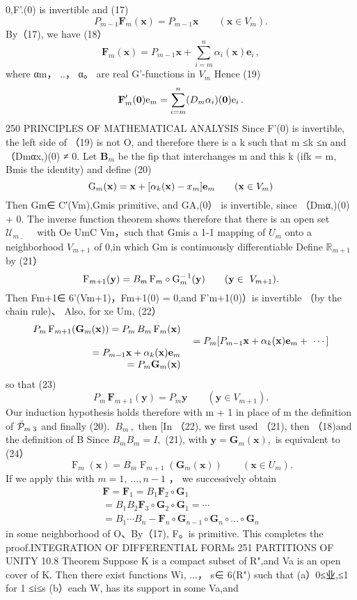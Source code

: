 0,F'.(0) is invertible and (17) $$ P_{m-1}\mathbf{F}_{m}(\mathbf{x})=P_{m-1}\mathbf{x}\qquad(\mathbf{x}\in V_{m}). $$ By（17), we have (18） $$ \mathbf{F}_{m}(\mathbf{x})=P_{m-1}\mathbf{x}+\sum_{i=m}^{n}\alpha_{i}(\mathbf{x})\mathbf{e}_{i}\,, $$ where αm， ..， α。 are real G'-functions in $V_{\mathit{m}}$ Hence (19) $$ {\bf F}_{m}^{\prime}({\bf0})\mathrm{e}_{m}=\sum_{i=m}^{n}(D_{m}\alpha_{i})({\bf0})\mathrm{e}_{i}\,. $$250 PRINCIPLES OF MATHEMATICAL ANALYSIS Since F'(0) is invertible, the left side of （19) is not O, and therefore there is a k such that m ≤k ≤n and（Dmαx,)(0) ≠ 0. Let ${\boldsymbol{B}}_{m}$ be the fip that interchanges m and this k (ifk = m, Bmis the identity) and define (20) $$ \mathrm{G}_{m}({\bf x})={\bf x}+[\alpha_{k}({\bf x})-x_{m}]{\bf e}_{m}\qquad({\bf x}\in V_{m}) $$ Then Gm∈ C′(Vm),Gmis primitive, and GA,(0） is invertible, since （Dmα,)(0) + 0. The inverse function theorem shows therefore that there is an open set ${\mathcal{U}}_{m\;,\;\;\;\;\;}$ with Oe UmC Vm，such that Gmis a 1-1 mapping of $U_{m}$ onto a neighborhood $V_{m+1}$ of 0,in which Gm is continuously differentiable Define $\mathbb{R}_{m+1}$ by (21） $$ \mathrm{F}_{m+1}({\bf y})=B_{m}\,\mathrm{F}_{m}\circ\mathrm{G}_{m}^{-\,1}({\bf y})\qquad({\bf y}\in\mathrm{~}V_{m+1}). $$ Then Fm+1∈ 6'(Vm+1)，Fm+1(0) = 0,and F'm+1(0)）is invertible （by the chain rule)、 Also, for xe Um, (22） $$ \begin{array}{r l}{P_{m}\operatorname{F}_{m+1}(\mathbf{G}_{m}(\mathbf{x}))=P_{m}\,B_{m}\operatorname{F}_{m}(\mathbf{x})}\\ {\,}&{{}=P_{m}[P_{m-1}\mathbf{x}+\alpha_{k}(\mathbf{x})\mathbf{e}_{m}+\ \cdots]}\\ {=P_{m-1}\mathbf{x}+\alpha_{k}(\mathbf{x})\mathbf{e}_{m}}\\ {=P_{m}\mathbf{G}_{m}(\mathbf{x})}\end{array} $$ so that (23) $$ P_{m}\,\mathbf{F}_{m+1}(\mathbf{y})=P_{m}\mathbf{y}\qquad(\mathbf{y}\in V_{m+1}). $$ Our induction hypothesis holds therefore with m + 1 in place of m the definition of $\bar{\cal P}_{m\;3}$ and finally (20). $\ B_{m}\,,$ then [In （22), we first used （21), then （18)and the definition of B Since $B_{m}B_{m}=I,$ (21), with $\mathbf{y}=\mathbf{G}_{m}(\mathbf{x}),$ is equivalent to (24） $$ \operatorname{F}_{m}(\mathbf{x})=B_{m}\operatorname{F}_{m+1}(\mathbf{G}_{m}(\mathbf{x}))\qquad(\mathbf{x}\in U_{m}). $$ If we apply this with $m=1,\ \ldots,n-1$ ， we successively obtain $$ \begin{array}{r}{\mathbf{F}=\mathbf{F}_{1}=B_{1}\mathbf{F}_{2}\circ\mathbf{G}_{1}}\\ {=B_{1}B_{2}\mathbf{F}_{3}\circ\mathbf{G}_{2}\circ\mathbf{G}_{1}=\dotsb}\\ {=B_{1}\dotsb B_{n}-\mathbf{F}_{n}\circ\mathbf{G}_{n-1}\circ\mathbf{G}_{n}\circ\mathbf{\dots}\circ\mathbf{G}_{n}}\end{array} $$ in some neighborhood of O、By（17), F。is primitive. This completes the proof.INTEGRATION OF DIFFERENTIAL FORMs 251 PARTITIONS OF UNITY 10.8 Theorem Suppose K is a compact subset of R",and {Va} is an open cover of K. Then there exist functions Wi, ...， s∈ 6(R") such that (a）0≤业,≤1 for 1 ≤i≤s (b）each W, has its support in some Va,and 